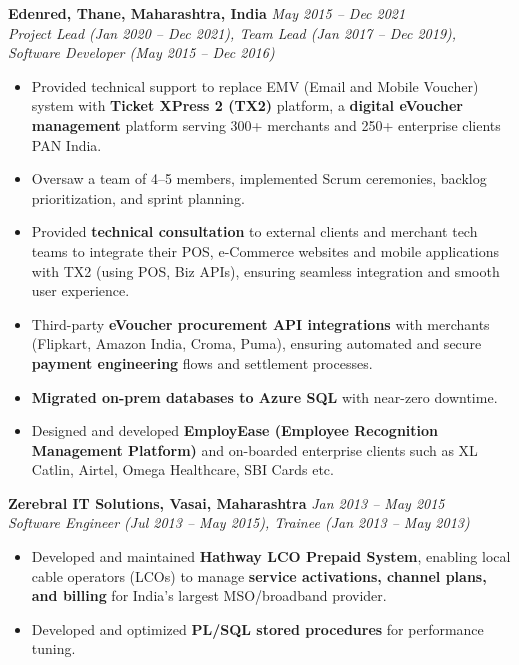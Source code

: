 \documentclass[12pt,a4paper]{article}
\begin{document}
\textbf{Edenred, Thane, Maharashtra, India} \hfill \textit{May 2015 -- Dec 2021}\\
\textit{Project Lead (Jan 2020 -- Dec 2021), \newline Team Lead (Jan 2017 -- Dec 2019), \newline Software Developer (May 2015 -- Dec 2016)}
\begin{itemize}
    \item Provided technical support to replace EMV (Email and Mobile Voucher) system with \textbf{Ticket XPress 2 (TX2)} platform, a \textbf{digital eVoucher management} platform serving 300+ merchants and 250+ enterprise clients PAN India.
    \item Oversaw a team of 4--5 members, implemented Scrum ceremonies, backlog prioritization, and sprint planning.
    \item Provided \textbf{technical consultation} to external clients and merchant tech teams to integrate their POS, e-Commerce websites and mobile applications with TX2 (using POS, Biz APIs), ensuring seamless integration and smooth user experience.
    \item Third-party \textbf{eVoucher procurement API integrations} with merchants (Flipkart, Amazon India, Croma, Puma), ensuring automated and secure \textbf{payment engineering} flows and settlement processes.
    \item \textbf{Migrated on-prem databases to Azure SQL} with near-zero downtime.
    \item Designed and developed \textbf{EmployEase (Employee Recognition Management Platform)} and on-boarded enterprise clients such as XL Catlin, Airtel, Omega Healthcare, SBI Cards etc.
\end{itemize}

\textbf{Zerebral IT Solutions, Vasai, Maharashtra} \hfill \textit{Jan 2013 -- May 2015}\\
\textit{Software Engineer (Jul 2013 -- May 2015), \newline Trainee (Jan 2013 -- May 2013)}
\begin{itemize}
    \item Developed and maintained \textbf{Hathway LCO Prepaid System}, enabling local cable operators (LCOs) to manage \textbf{service activations, channel plans, and billing} for India's largest MSO/broadband provider.
    \item Developed and optimized \textbf{PL/SQL stored procedures} for performance tuning.
\end{itemize}
\end{document}
